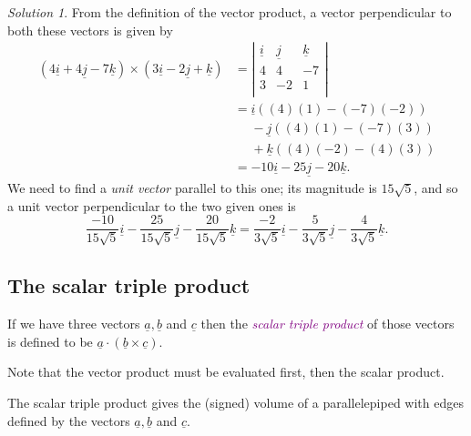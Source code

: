 \documentclass[
  english,
  11pt,
  oneside]{book}
\newcommand{\slide}{}
\theoremstyle{definition}
\theoremstyle{definition}
\theoremstyle{definition}
\theoremstyle{definition}
\theoremstyle{remark}
\newtheorem*{solution}{Solution}
\begin{document}
\begin{solution}
From the definition of the vector product, a vector perpendicular to both these vectors is given by
\begin{align*}
(4\underline i+4\underline j-7\underline k) \times(3\underline i - 2\underline j+\underline k)& = \left|\begin{array}{ccc}\underline i&\underline j&\underline k\\4&4&-7\\3&-2&1\\\end{array}\right|\\
&= \underline i((4)(1)-(-7)(-2))\\
&\phantom{= }-\underline j((4)(1)-(-7)(3))\\
&\phantom{= }+\underline k((4)(-2)-(4)(3))\\
&=-10\underline i-25\underline j-20\underline k.
\end{align*}
We need to find a \emph{unit vector} parallel to this one; its magnitude is \(15\sqrt{5}\), and so a unit vector perpendicular to the two given ones is
\[
\frac{-10}{15\sqrt{5}}\underline i-\frac{25}{15\sqrt{5}}\underline j-\frac{20}{15\sqrt{5}}\underline k = \frac{-2}{3\sqrt{5}}\underline i-\frac{5}{3\sqrt{5}}\underline j-\frac{4}{3\sqrt{5}}\underline k.
\]
\end{solution}

\begin{slidesonly}

\slide

\hbox{}
\slide

\end{slidesonly}

\subsection{The scalar triple product}\label{the-scalar-triple-product}

If we have three vectors \(\underline a, \underline b\) and \(\underline c\) then the \textcolor{purple}{\em scalar triple product} of those vectors is defined to be \(\underline a \cdot(\underline b\times\underline c)\).

Note that the vector product must be evaluated first, then the scalar product.

The scalar triple product gives the (signed) volume of a parallelepiped with edges defined by the vectors \(\underline a, \underline b\) and \(\underline c\).
\end{document}
